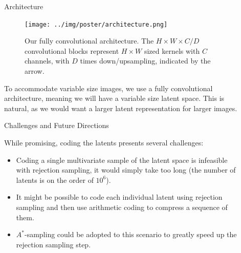 \documentclass[final]{beamer}
\newlength{\sepwid}
\newlength{\onecolwid}
\newlength{\twocolwid}
\begin{document}
\begin{frame}[t]
\begin{columns}[t]
\begin{column}{\twocolwid}
\begin{columns}[t,totalwidth=\twocolwid]
\begin{column}{\onecolwid}

\end{column} %

\end{columns} %

\end{column} %

\begin{column}{\sepwid}\end{column} %

\begin{column}{\onecolwid} %


\begin{block}{Architecture}
  \begin{figure}[H]
    \centering
    \texttt{[image: ../img/poster/architecture.png]}
    \label{fig:architecture}
    \caption{Our fully convolutional architecture. The $H\times W\times C / D$ convolutional
      blocks represent $H \times W$ sized kernels with $C$ channels, with $D$
      times down/upsampling, indicated by the arrow.}
  \end{figure}

\noindent
To accommodate variable size images, we use a fully convolutional
architecture, meaning we will have a variable size latent space. This is
natural, as we would want a larger latent representation for larger images.

\end{block}

\begin{block}{Challenges and Future Directions}

  While promising, coding the latents presents several
  challenges:
  \begin{itemize}
  \item Coding a single multivariate sample of the latent space is infeasible
    with rejection sampling, it would simply take too long (the number of
    latents is on the order of $10^6$).
  \item It might be possible to code each individual latent using rejection sampling and
    then use arithmetic coding to compress a sequence of them. 
  \item $A^*$-sampling could be adopted to this scenario to greatly speed up the
    rejection sampling step.
  \end{itemize}


\end{block}
\end{column}
\end{columns}
\end{frame}
\end{document}
